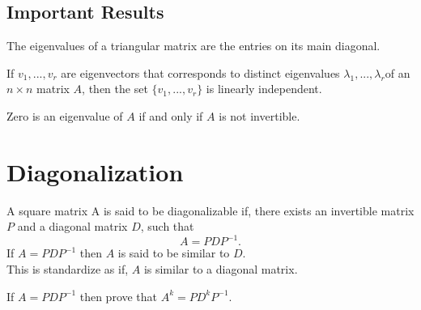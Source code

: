 \documentclass[aima104_lecturenotes_ku.tex]{subfiles}
\begin{document}
\subsection{Important Results}
\begin{theorem}
  The eigenvalues of a triangular matrix are the entries on its main diagonal.
\end{theorem}

\begin{theorem}
  If $v_1, ..., v_r$ are eigenvectors that corresponds to distinct eigenvalues $\lambda _1, ..., \lambda _r$of an $n \times n$ matrix $A$, then the set $\{v_1, ..., v_r\}$ is linearly independent.
  \end{theorem}

  \begin{theorem}
    Zero is an eigenvalue of $A$ if and only if $A$ is not invertible.
  \end{theorem}
\section{Diagonalization}
\begin{mdframed}
  A square matrix A is said to be diagonalizable if, there exists an invertible matrix $P$ and a diagonal matrix $D$, such that $$A = PDP^{-1}.$$ If $A = PDP^{-1}$ then $A$ is said to be similar to $D$. \\
  This is standardize as if, $A$ is similar to a diagonal matrix.
\end{mdframed}
\vspace{4mm}

If $A = PDP^{-1}$ then prove that $A^k = PD^kP^{-1}$.
\clearpage
\end{document}
